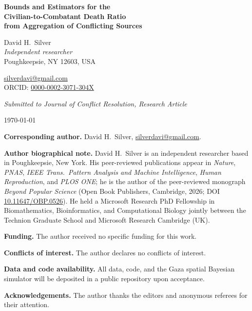\documentclass[12pt,a4paper]{article}
\begin{document}
\begin{center}
{\LARGE\bfseries Bounds and Estimators for the\\[2pt] Civilian-to-Combatant Death Ratio\\[2pt] from Aggregation of Conflicting Sources}

\vspace{18pt}

{\large David H.\ Silver}\\[6pt]

\textit{Independent researcher}\\
Poughkeepsie, NY 12603, USA

\vspace{4pt}
\href{mailto:silverdavi@gmail.com}{silverdavi@gmail.com}\\
ORCID: \href{https://orcid.org/0000-0002-3071-304X}{0000-0002-3071-304X}

\vspace{20pt}

{\small\textit{Submitted to Journal of Conflict Resolution, Research Article}}

\vspace{6pt}
\today
\end{center}

\vspace{18pt}

\noindent\textbf{Corresponding author.} David H.\ Silver, \href{mailto:silverdavi@gmail.com}{silverdavi@gmail.com}.

\bigskip

\noindent\textbf{Author biographical note.}
David H.\ Silver is an independent researcher based in Poughkeepsie, New York. His peer-reviewed publications appear in \emph{Nature}, \emph{PNAS}, \emph{IEEE Trans.\ Pattern Analysis and Machine Intelligence}, \emph{Human Reproduction}, and \emph{PLOS ONE}; he is the author of the peer-reviewed monograph \emph{Beyond Popular Science} (Open Book Publishers, Cambridge, 2026; DOI \href{https://doi.org/10.11647/OBP.0526}{10.11647/OBP.0526}). He held a Microsoft Research PhD Fellowship in Biomathematics, Bioinformatics, and Computational Biology jointly between the Technion Graduate School and Microsoft Research Cambridge (UK).

\bigskip

\noindent\textbf{Funding.} The author received no specific funding for this work.

\bigskip

\noindent\textbf{Conflicts of interest.} The author declares no conflicts of interest.

\bigskip

\noindent\textbf{Data and code availability.} All data, code, and the Gaza spatial Bayesian simulator will be deposited in a public repository upon acceptance.

\bigskip

\noindent\textbf{Acknowledgements.} The author thanks the editors and anonymous referees for their attention.
\end{document}
